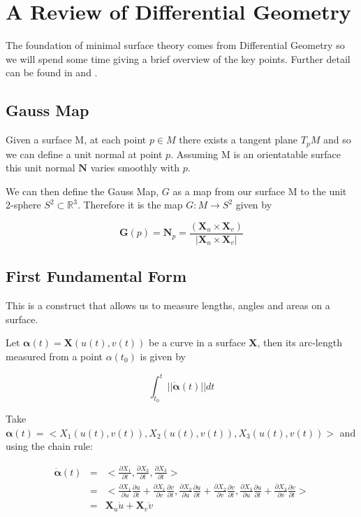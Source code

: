 \section{A Review of Differential Geometry}
The foundation of minimal surface theory comes from Differential Geometry so we will spend some time giving a brief overview of the key points. Further detail can be found in \cite{DoC} and \cite{EDG}.

\subsection{Gauss Map}
Given a surface M, at each point $p \in M$ there exists a tangent plane $T_pM$ and so we can define a unit normal at point $p$. Assuming M is an orientatable surface this unit normal $\mathbf N$ varies smoothly with $p$.

We can then define the Gauss Map, $G$ as a map from our surface M to the unit 2-sphere
$\mathit S^2 \subset \mathbb{R}^3$. Therefore it is the map $G:M \to \mathit S^2$ given by

\begin{displaymath}
\mathbf G(p) = \mathbf N_p =  \frac{(\mathbf X_u \times \mathbf X_v)}{|\mathbf X_u \times \mathbf X_v|}
\end{displaymath}

\subsection{First Fundamental Form}

This is a construct that allows us to measure lengths, angles and areas on a surface.

Let $\mathbf \alpha(t)= \mathbf X(u(t),v(t))$ be a curve in a surface $\mathbf X$, then its arc-length measured from a point $\alpha(t_0)$ is given by

\begin{displaymath}
\int_{t_0}^t ||\mathbf{\dot{\alpha}}(t)|| dt
\end{displaymath}

Take $\mathbf \alpha(t) = <X_1(u(t),v(t)),X_2(u(t),v(t)),X_3(u(t),v(t))>$ and using the chain rule:

\begin{eqnarray}
\nonumber
\mathbf{\dot{\alpha}}(t) &=& <\frac{\partial X_1}{\partial t},\frac{\partial X_2}{\partial t},\frac{\partial X_3}{\partial t}> \\
\nonumber
&=& <\frac{\partial X_1}{\partial u}\frac{\partial u}{\partial t}+ \frac{\partial X_1}{\partial v}\frac{\partial v}{\partial t},\frac{\partial X_2}{\partial u}\frac{\partial u}{\partial t}+ \frac{\partial X_2}{\partial v}\frac{\partial v}{\partial t},\frac{\partial X_3}{\partial u}\frac{\partial u}{\partial t}+ \frac{\partial X_3}{\partial v}\frac{\partial v}{\partial t}> \\
\nonumber
&=&\mathbf X_u \dot u+ \mathbf X_v \dot v
\end{eqnarray}

